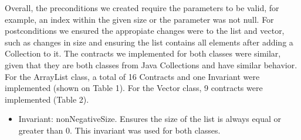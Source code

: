 \documentclass[a4paper]{article}
\begin{document}
Overall, the preconditions we created require the parameters to be valid, for example, an index within the given size or the parameter was not null. For postconditions we ensured the appropiate changes were to the list and vector, such as changes in size and ensuring the list contains all elements after adding a Collection to it.
The contracts we implemented for both classes were similar, given that they are both classes from Java Collections and have similar behavior. 
For the ArrayList class, a total of 16 Contracts and one Invariant were implemented (shown on Table 1). For the Vector class, 9 contracts were implemented (Table 2). 
\begin{itemize}
 \item Invariant: nonNegativeSize. Ensures the size of the list is always equal or greater than 0. This invariant was used for both classes.
\end{itemize}
\end{document}
